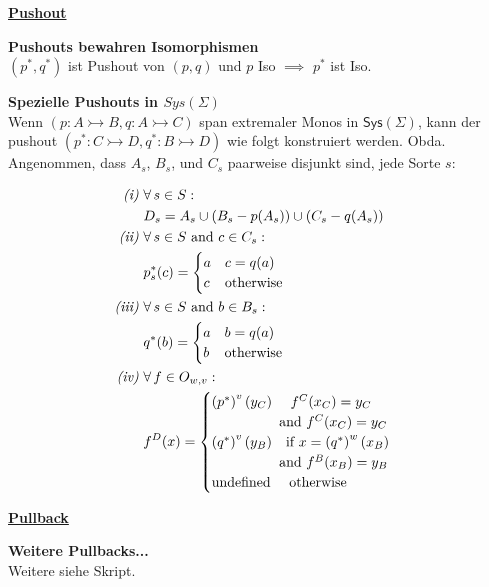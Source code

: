 \begin{multicols}{2}

\textbf{\underline{Pushout}} 

\textbf{ Pushouts bewahren Isomorphismen} \\
$(p^*, q^*)$ ist Pushout von $(p,q)$ und $p$ Iso $\implies$ $p^*$ ist Iso.

\textbf{ Spezielle Pushouts in $Sys(\Sigma)$} \\
Wenn $(p:A\rightarrowtail B,q:A\rightarrowtail C)$ span extremaler Monos  in $\mathsf{Sys}(\Sigma)$, kann der pushout $(p^{*}:C\rightarrowtail D,q^{*}:B\rightarrowtail D)$
wie folgt konstruiert werden. Obda. Angenommen, dass $A_{s}$, $B_{s}$, und $C_{s}$ paarweise disjunkt sind, jede Sorte  $s$:

\begin{align*}
\textrm{\emph{(i)} } & \forall \, s\in S: \\ & D_{s}=A_{s}\cup\left(B_{s}-p(A_{s})\right)\cup\left(C_{s}-q(A_{s})\right)\\
\textrm{\emph{(ii)} } & \forall \, s \in S\textrm{ and }c\in C_{s}: \\ &  p_{s}^{*}(c)=\begin{cases}
a & c=q(a)\\
c & \textrm{otherwise} 
\end{cases}\\
\textrm{\emph{(iii)} } &  \forall \, s\in S\textrm{ and }b\in B_{s}: \\ & q^{*}(b)=\begin{cases}
a & b=q(a)\\
b & \textrm{otherwise}
\end{cases}\\
\textrm{\emph{(iv)} } &  \forall \, f \in O_{w,v}:\\ & f^{D}(x)=\begin{cases}
\left(p^{*}\right)^{v}(y_{C}) \, \, \, \, \, \,  \, \,  f^{C}(x_{C})=y_{C}\\
\, \, \, \, \, \,  \, \, \, \, \, \, \, \,  \, \, \, \, \, \, \, \,  \, \, \, \, \,  \textrm{ and }f^{C}(x_{C})=y_{C}\\
\left(q^{*}\right)^{v}(y_{B}) \, \, \, \, \, \,    \textrm{if }x=\left(q^{*}\right)^{w}(x_{B})\\
\, \, \, \, \, \,  \, \, \, \, \, \, \, \,  \, \, \, \, \, \, \, \,  \, \, \, \, \, \textrm{ and }f^{B}(x_{B})=y_{B}\\
\textrm{undefined} \, \, \, \, \, \,  \, \,  \textrm{otherwise}
\end{cases}
\end{align*}



\columnbreak

\textbf{\underline{Pullback}} 

\textbf{Weitere Pullbacks...} \\
Weitere siehe Skript.

\end{multicols}



